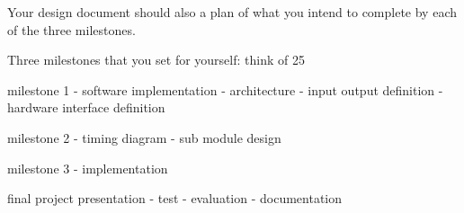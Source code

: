 Your design document should also a plan of what you intend to complete by each of the three milestones.

Three milestones that you set for yourself: think of 25%


milestone 1
- software implementation
- architecture
- input output definition
- hardware interface definition

milestone 2
- timing diagram
- sub module design

milestone 3
- implementation

final project presentation
- test
- evaluation
- documentation

